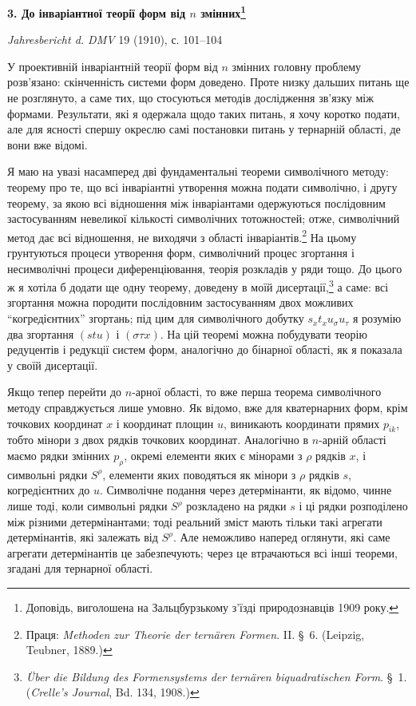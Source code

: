\documentclass[11pt]{article}
\begin{document}
\begin{center}
{\Large\bfseries 3. До інваріантної теорії форм від $n$ змінних\footnote{Доповідь, виголошена на Зальцбурзькому з'їзді природознавців 1909 року.}}\par
\vspace{1.2em}
\emph{Jahresbericht d. DMV} 19 (1910), с. 101--104
\end{center}

\vspace{1em}
У проективній інваріантній теорії форм від $n$ змінних головну проблему розв'язано: скінченність системи форм доведено. Проте низку дальших питань ще не розглянуто, а саме тих, що стосуються методів дослідження зв'язку між формами. Результати, які я одержала щодо таких питань, я хочу коротко подати, але для ясності спершу окреслю самі постановки питань у тернарній області, де вони вже відомі.

Я маю на увазі насамперед дві фундаментальні теореми символічного методу: теорему про те, що всі інваріантні утворення можна подати символічно, і другу теорему, за якою всі відношення між інваріантами одержуються послідовним застосуванням невеликої кількості символічних тотожностей; отже, символічний метод дає всі відношення, не виходячи з області інваріантів.\footnote{Праця: \emph{Methoden zur Theorie der ternären Formen}. II. \S\ 6. (Leipzig, Teubner, 1889.)} На цьому грунтуються процеси утворення форм, символічний процес згортання і несимволічні процеси диференціювання, теорія розкладів у ряди тощо. До цього ж я хотіла б додати ще одну теорему, доведену в моїй дисертації,\footnote{\emph{Über die Bildung des Formensystems der ternären biquadratischen Form}. \S\ 1. (\emph{Crelle's Journal}, Bd. 134, 1908.)} а саме: всі згортання можна породити послідовним застосуванням двох можливих ``когредієнтних'' згортань; під цим для символічного добутку $s_x t_x u_\sigma u_\tau$ я розумію два згортання $(stu)$ і $(\sigma\tau x)$. На цій теоремі можна побудувати теорію редуцентів і редукції систем форм, аналогічно до бінарної області, як я показала у своїй дисертації.

Якщо тепер перейти до $n$-арної області, то вже перша теорема символічного методу справджується лише умовно. Як відомо, вже для кватернарних форм, крім точкових координат $x$ і координат площин $u$, виникають координати прямих $p_{ik}$, тобто мінори з двох рядків точкових координат. Аналогічно в $n$-арній області маємо рядки змінних $p_\rho$, окремі елементи яких є мінорами з $\rho$ рядків $x$, і символьні рядки $S^\rho$, елементи яких поводяться як мінори з $\rho$ рядків $s$, когредієнтних до $u$. Символічне подання через детермінанти, як відомо, чинне лише тоді, коли символьні рядки $S^\rho$ розкладено на рядки $s$ і ці рядки розподілено між різними детермінантами; тоді реальний зміст мають тільки такі агрегати детермінантів, які залежать від $S^\rho$. Але неможливо наперед оглянути, які саме агрегати детермінантів це забезпечують; через це втрачаються всі інші теореми, згадані для тернарної області.
\end{document}
